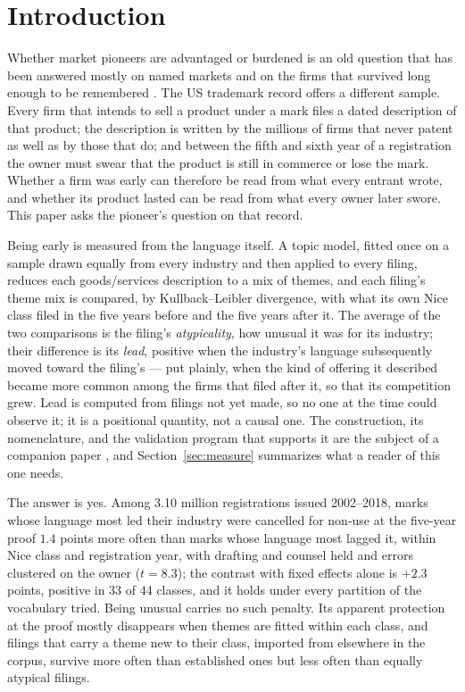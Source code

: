 \section{Introduction}\label{sec:intro}

Whether market pioneers are advantaged or burdened is an old question
that has been answered mostly on named markets and on the firms that
survived long enough to be remembered \citep{GolderTellis1993,
SemadeniAnderson2010}. The US trademark record offers a different sample.
Every firm that intends to sell a product under a mark files a dated
description of that product; the description is written by the millions
of firms that never patent as well as by those that do; and between the
fifth and sixth year of a registration the owner must swear that the
product is still in commerce or lose the mark. Whether a firm was early
can therefore be read from what every entrant wrote, and whether its
product lasted can be read from what every owner later swore. This paper
asks the pioneer's question on that record.

Being early is measured from the language itself. A topic model, fitted
once on a sample drawn equally from every industry and then applied to
every filing, reduces each goods/services description to a mix of
themes, and each filing's theme mix is compared, by Kullback--Leibler
divergence, with what its own Nice class filed in the five years before
and the five years after it. The average of the two comparisons is the
filing's \emph{atypicality}, how unusual it was for its industry; their
difference is its \emph{lead}, positive when the industry's language
subsequently moved toward the filing's --- put plainly, when the kind
of offering it described became more common among the firms that filed
after it, so that its competition grew. Lead is computed from filings
not yet made, so no one at the time could observe it; it is a positional
quantity, not a causal one. The construction, its nomenclature, and the
validation program that supports it are the subject of a companion paper
\citep{SilverCorpus2026}, and Section~\ref{sec:measure} summarizes what a
reader of this one needs.

The answer is yes. Among 3.10 million registrations issued 2002--2018,
marks whose language most led their industry were cancelled for non-use
at the five-year proof $1.4$ points more often than marks whose language
most lagged it, within Nice class and registration year, with drafting
and counsel held and errors clustered on the owner ($t = 8.3$); the
contrast with fixed effects alone is $+2.3$ points, positive in 33 of 44
classes, and it holds under every partition of the vocabulary tried.
Being unusual carries no such penalty. Its apparent protection at the
proof mostly disappears when themes are fitted within each class, and
filings that carry a theme new to their class, imported from elsewhere
in the corpus, survive more often than established ones but less often
than equally atypical filings.

